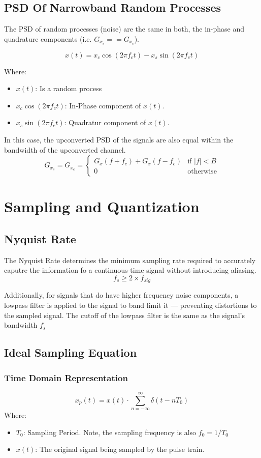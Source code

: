 \documentclass[10pt]{article}
\begin{document}
\subsection{PSD Of Narrowband Random Processes}
The PSD of random processes (noise) are the same in both, the in-phase and quadrature components (i.e. $G_{x_s} == G_{x_c}$).

\[
    x(t) = x_c \cos(2\pi f_c t) - x_s \sin(2 \pi f_c t)
\]

\noindent Where:
\begin{itemize}
    \item $x(t)$: Is a random process
    \item $x_c\cos(2\pi f_c t)$: In-Phase component of $x(t)$.
    \item $x_s\sin(2\pi f_c t)$: Quadratur component of $x(t)$.
\end{itemize}

In this case, the upconverted PSD of the signals are also equal within the bandwidth of the upconverted channel.
\[
    G_{x_s} = G_{x_c} =
    \begin{cases}
      G_x(f + f_c) + G_x(f - f_c) & \text{if } |f| < B\\
      0 & \text{otherwise}
   \end{cases}
\]

\section{Sampling and Quantization}
\subsection{Nyquist Rate}
The Nyquist Rate determines the minimum sampling rate required to accurately caputre the information fo a continuous-time signal without introducing aliasing.
\[
    f_s \ge 2 \times f_{sig}
\]

Additionally, for signals that do have higher frequency noise components, a lowpass filter is applied to the signal to band limit it --- preventing distortions to the sampled signal. The cutoff of the lowpass filter is the same as the signal's bandwidth $f_s$

\subsection{Ideal Sampling Equation}
\subsubsection{Time Domain Representation}
\[
    x_p(t) = x(t) \cdot \sum_{n=-\infty}^{\infty}\delta{\left(t-nT_0\right)}
\]
\noindent Where:
\begin{itemize}
    \item $T_0$: Sampling Period. Note, the sampling frequency is also $f_0=1/T_0$
    \item $x(t)$: The original signal being sampled by the pulse train.
\end{itemize}
\end{document}
